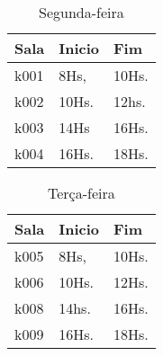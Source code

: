 \begin{table}[!h]
\centering
\caption{Segunda-feira}
\label{my-label}
\begin{tabular}{|l|l|l|}
\hline
\textbf{Sala}    &\textbf{Inicio}                     &\textbf{Fim}              \\ \hline
k001                     & 8Hs,                       & 10Hs.                    \\ \hline
k002                     & 10Hs.                      & 12hs.                    \\ \hline
k003                     & 14Hs                       & 16Hs.                    \\ \hline
k004                     & 16Hs.                      & 18Hs.                    \\ \hline
\end{tabular}
\end{table}
\begin{table}[!h]
\centering
\caption{Terça-feira}
\label{my-label}
\begin{tabular}{|l|l|l|}
\hline
\textbf{Sala}    &\textbf{Inicio}                     &\textbf{Fim}              \\ \hline						
k005                     & 8Hs,                       & 10Hs.                    \\ \hline
k006                     & 10Hs.                      & 12Hs.                    \\ \hline
k008                     & 14hs.                      & 16Hs.                    \\ \hline
k009                     & 16Hs.                      & 18Hs.                    \\ \hline
\end{tabular} 
\end{table}
